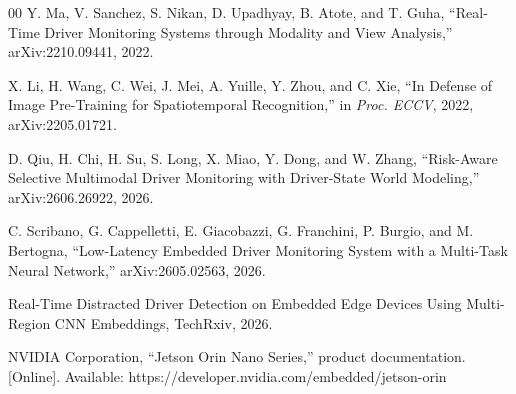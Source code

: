 \documentclass[conference]{IEEEtran}
\begin{document}
\begin{thebibliography}{00}
 Y. Ma, V. Sanchez, S. Nikan, D. Upadhyay, B. Atote, and T. Guha, ``Real-Time Driver Monitoring Systems through Modality and View Analysis,'' arXiv:2210.09441, 2022.

 X. Li, H. Wang, C. Wei, J. Mei, A. Yuille, Y. Zhou, and C. Xie, ``In Defense of Image Pre-Training for Spatiotemporal Recognition,'' in \emph{Proc. ECCV}, 2022, arXiv:2205.01721.

 D. Qiu, H. Chi, H. Su, S. Long, X. Miao, Y. Dong, and W. Zhang, ``Risk-Aware Selective Multimodal Driver Monitoring with Driver-State World Modeling,'' arXiv:2606.26922, 2026.

 C. Scribano, G. Cappelletti, E. Giacobazzi, G. Franchini, P. Burgio, and M. Bertogna, ``Low-Latency Embedded Driver Monitoring System with a Multi-Task Neural Network,'' arXiv:2605.02563, 2026.

 Real-Time Distracted Driver Detection on Embedded Edge Devices Using Multi-Region CNN Embeddings, TechRxiv, 2026. %

 NVIDIA Corporation, ``Jetson Orin Nano Series,'' product documentation. [Online]. Available: https://developer.nvidia.com/embedded/jetson-orin

\end{thebibliography}
\end{document}
